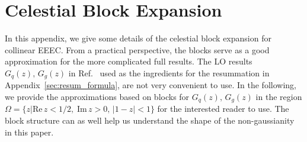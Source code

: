 \documentclass[letterpaper,11pt]{article}
\def\App#1{Appendix~\ref{#1}}
\DeclareRobustCommand{\App}[1]{App.~\ref{#1}}
\DeclareRobustCommand{\Ref}[1]{Ref.~\cite{#1}}
\begin{document}
\section{Celestial Block Expansion \label{sec:block_expansion}}


In this appendix, we give some details of the celestial block expansion for collinear EEEC.
%
From a practical perspective, the blocks serve as a good approximation for the more complicated full results.
%
The LO results $G_q(z),\, G_g(z)$ in \Ref{Chen:2019bpb} used as the ingredients for the resummation in \App{sec:resum_formula}, are not very convenient to use.
%
In the following, we provide the approximations based on blocks for $G_q(z),\, G_g(z)$ in the region $\Omega=\{z| \mathrm{Re}\, z < 1/2,\; \mathrm{Im}\,z>0,\, |1-z|<1\}$ for the interested reader to use.
%
The block structure can as well help us understand the shape of the non-gaussianity in this paper. 
\end{document}
